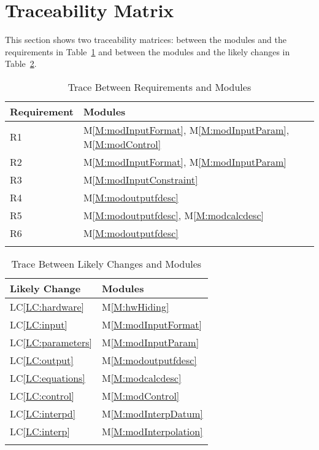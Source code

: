 \documentclass[12pt]{article}
\begin{document}
\section{Traceability Matrix}
\label{Sec:TracMatr}
This section shows two traceability matrices: between the modules and the requirements in Table~\ref{Table:TracBetwRequandModu} and between the modules and the likely changes in Table~\ref{Table:TracBetwLikeChanandModu}.
\begin{longtable}{l l}
\toprule
Requirement & Modules
\\
\midrule
R1 & M\ref{M:modInputFormat}, M\ref{M:modInputParam}, M\ref{M:modControl}
\\
R2 & M\ref{M:modInputFormat}, M\ref{M:modInputParam}
\\
R3 & M\ref{M:modInputConstraint}
\\
R4 & M\ref{M:modoutputfdesc}
\\
R5 & M\ref{M:modoutputfdesc}, M\ref{M:modcalcdesc}
\\
R6 & M\ref{M:modoutputfdesc}
\\
\bottomrule
\caption{Trace Between Requirements and Modules}
\label{Table:TracBetwRequandModu}
\end{longtable}
\begin{longtable}{l l}
\toprule
Likely Change & Modules
\\
\midrule
LC\ref{LC:hardware} & M\ref{M:hwHiding}
\\
LC\ref{LC:input} & M\ref{M:modInputFormat}
\\
LC\ref{LC:parameters} & M\ref{M:modInputParam}
\\
LC\ref{LC:output} & M\ref{M:modoutputfdesc}
\\
LC\ref{LC:equations} & M\ref{M:modcalcdesc}
\\
LC\ref{LC:control} & M\ref{M:modControl}
\\
LC\ref{LC:interpd} & M\ref{M:modInterpDatum}
\\
LC\ref{LC:interp} & M\ref{M:modInterpolation}
\\
\bottomrule
\caption{Trace Between Likely Changes and Modules}
\label{Table:TracBetwLikeChanandModu}
\end{longtable}
\end{document}

